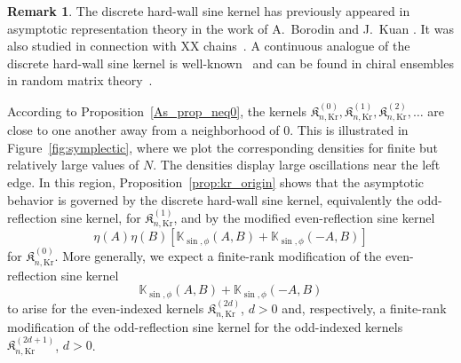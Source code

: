 \documentclass[reqno,11pt]{amsart}
\theoremstyle{plain}
\theoremstyle{definition}
\newtheorem{remark}[thm]{Remark}
\numberwithin{equation}{section}
\begin{document}
\begin{remark}
The discrete hard-wall sine kernel has previously appeared in asymptotic representation theory in the work of A.~Borodin and J.~Kuan \cite{borodin2010random}.
It was also studied in connection with XX chains~\cite{Fagotti2011}. A continuous analogue of the discrete hard-wall sine kernel is well-known~\cite{Erhardt2007Dyson,verbaarschot1994,verbaarschot2000} and can be found in chiral ensembles in random matrix theory~\cite[Sections 3.1 and 7.2.7]{forrester2010log}. 
\end{remark}
According to Proposition~\ref{As_prop_neq0}, the kernels $\mathfrak K_{n,\mathrm{Kr}}^{(0)}, \mathfrak K_{n,\mathrm{Kr}}^{(1)}, \mathfrak K_{n,\mathrm{Kr}}^{(2)},\dots$ are close to one another away from a neighborhood of $0$. This is illustrated in Figure~\ref{fig:symplectic}, where we plot the corresponding densities for finite but relatively large values of $N$. 
The densities display large oscillations near the left edge. In this region, Proposition~\ref{prop:kr_origin} shows that the asymptotic behavior is governed by the discrete hard-wall sine kernel, equivalently  the odd-reflection sine kernel, for $\mathfrak K_{n,\mathrm{Kr}}^{(1)}$, and by the modified even-reflection sine kernel 
$$
\eta(A)\eta(B)\left[
\mathbb K_{\sin,\phi}(A,B)+\mathbb K_{\sin,\phi}(-A,B)\right]
$$ 
for $\mathfrak K_{n,\mathrm{Kr}}^{(0)}$. More generally, we expect a finite-rank modification of the even-reflection sine kernel 
$$
\mathbb K_{\sin,\phi}(A,B)+\mathbb K_{\sin,\phi}(-A,B)
$$ 
to arise for the even-indexed kernels $\mathfrak K_{n,\mathrm{Kr}}^{(2d)}$, $d> 0$ and, respectively,  a finite-rank modification of the odd-reflection sine kernel for the odd-indexed kernels $\mathfrak K_{n,\mathrm{Kr}}^{(2d+1)}$, $d>0$.
\end{document}
